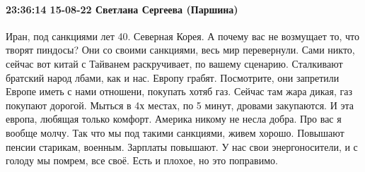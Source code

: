  
 
 
 
 

\paragraph{23:36:14 15-08-22 Светлана Сергеева (Паршина)}

Иран, под санкциями лет 40. Северная Корея. А почему вас не возмущает то, что
творят пиндосы? Они со своими санкциями, весь мир перевернули. Сами никто,
сейчас вот китай с Тайванем раскручивает, по вашему сценарию. Сталкивают
братский народ лбами, как и нас. Европу грабят. Посмотрите, они запретили
Европе иметь с нами отношени, покупать хотяб газ. Сейчас там жара дикая, газ
покупают дорогой. Мыться в 4х местах, по 5 минут, дровами закупаются. И эта
европа, любящая только комфорт. Америка никому не несла добра. Про вас я вообще
молчу. Так что мы под такими санкциями, живем хорошо. Повышают пенсии старикам,
военным. Зарплаты повышают. У нас свои энергоносители, и с голоду мы помрем,
все своё. Есть и плохое, но это поправимо.
